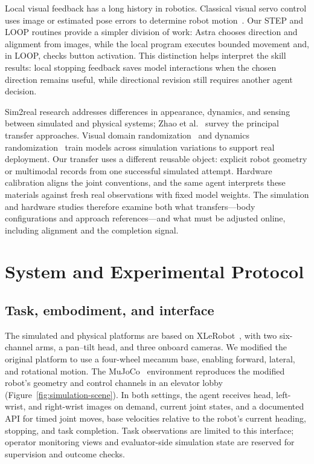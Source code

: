 \documentclass[11pt]{article}
\begin{document}
Local visual feedback has a long history in robotics. Classical visual servo control uses image or estimated pose errors to determine robot motion~\cite{chaumette2006visual}. Our STEP and LOOP routines provide a simpler division of work: Astra chooses direction and alignment from images, while the local program executes bounded movement and, in LOOP, checks button activation. This distinction helps interpret the skill results: local stopping feedback saves model interactions when the chosen direction remains useful, while directional revision still requires another agent decision.

Sim2real research addresses differences in appearance, dynamics, and sensing between simulated and physical systems; Zhao et al.~\cite{zhao2020sim2real} survey the principal transfer approaches. Visual domain randomization~\cite{tobin2017domain} and dynamics randomization~\cite{peng2018dynamics} train models across simulation variations to support real deployment. Our transfer uses a different reusable object: explicit robot geometry or multimodal records from one successful simulated attempt. Hardware calibration aligns the joint conventions, and the same agent interprets these materials against fresh real observations with fixed model weights. The simulation and hardware studies therefore examine both what transfers---body configurations and approach references---and what must be adjusted online, including alignment and the completion signal.

\section{System and Experimental Protocol}\label{sec:system}
\subsection{Task, embodiment, and interface}
The simulated and physical platforms are based on XLeRobot~\cite{xlerobot}, with two six-channel arms, a pan--tilt head, and three onboard cameras. We modified the original platform to use a four-wheel mecanum base, enabling forward, lateral, and rotational motion. The MuJoCo~\cite{todorov2012mujoco} environment reproduces the modified robot's geometry and control channels in an elevator lobby (Figure~\ref{fig:simulation-scene}). In both settings, the agent receives head, left-wrist, and right-wrist images on demand, current joint states, and a documented API for timed joint moves, base velocities relative to the robot's current heading, stopping, and task completion. Task observations are limited to this interface; operator monitoring views and evaluator-side simulation state are reserved for supervision and outcome checks.
\end{document}

